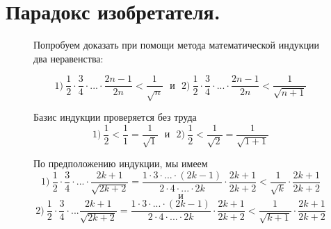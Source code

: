 \newpage

\section{Парадокс изобретателя.}

{\setlength{\intextsep}{2pt}
\begin{figure}[h]
\begin{minipage}{0.74\linewidth}\setlength{\parindent}{1.5em}
Попробуем доказать при помощи метода математической индукции два неравенства:
\par
\begin{equation*}
  1)~\frac{1}{2} \cdot \frac{3}{4} \cdot ... \cdot \frac{2n - 1}{2n} < \frac{1}{\sqrt{n}} ~~~и~~~
  2)~\frac{1}{2} \cdot \frac{3}{4} \cdot ... \cdot \frac{2n - 1}{2n} < \frac{1}{\sqrt{n + 1}}
\end{equation*}

\par
Базис индукции проверяется без труда
\begin{equation*}
  1)~ \frac{1}{2} < \frac{1}{1} = \frac{1}{\sqrt{1}} ~~~и~~~   
  2)~ \frac{1}{2} < \frac{1}{\sqrt{2}} = \frac{1}{\sqrt{1 + 1}}
\end{equation*}
\par
По предположению индукции, мы имеем
\begin{equation*}
  1)~\frac{1}{2} \cdot \frac{3}{4} \cdot ... \cdot \frac{2k + 1}{\sqrt{2k + 2}} = \frac{1 \cdot 3 \cdot ... \cdot (2k - 1)}{2 \cdot 4 \cdot ... \cdot 2k} \cdot \frac{2k + 1}{2k + 2} < \frac{1}{\sqrt{k}} \cdot \frac{2k + 1}{2k + 2}
\end{equation*}
$$и$$
\begin{equation*}
  2)~\frac{1}{2} \cdot \frac{3}{4} \cdot ... \frac{2k + 1}{\sqrt{2k + 2}} = \frac{1 \cdot 3 \cdot ... \cdot (2k - 1)}{2 \cdot 4 \cdot ... \cdot 2k} \cdot \frac{2k + 1}{2k + 2} < \frac{1}{\sqrt{k + 1}} \cdot \frac{2k + 1}{2k + 2}
\end{equation*}


\end{minipage}
\end{figure}}
